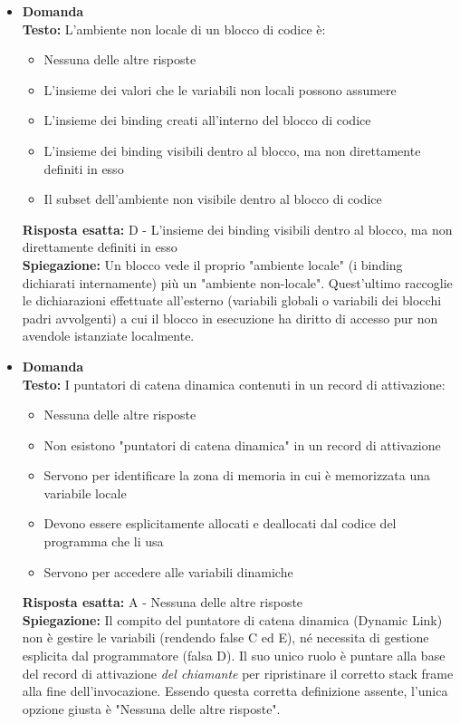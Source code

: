 \documentclass[12pt, a4paper]{article}
\newcounter{domandateoria}
\begin{document}
\begin{itemize}
    \item {}\textbf{Domanda \thedomandateoria} \\
    \textbf{Testo:} L'ambiente non locale di un blocco di codice è:
    \begin{itemize}
        \item[A)] Nessuna delle altre risposte
        \item[B)] L'insieme dei valori che le variabili non locali possono assumere
        \item[C)] L'insieme dei binding creati all'interno del blocco di codice
        \item[D)] L'insieme dei binding visibili dentro al blocco, ma non direttamente definiti in esso
        \item[E)] Il subset dell'ambiente non visibile dentro al blocco di codice
    \end{itemize}
    \textbf{Risposta esatta:} D - L'insieme dei binding visibili dentro al blocco, ma non direttamente definiti in esso \\
    \textbf{Spiegazione:} Un blocco vede il proprio "ambiente locale" (i binding dichiarati internamente) più un "ambiente non-locale". Quest'ultimo raccoglie le dichiarazioni effettuate all'esterno (variabili globali o variabili dei blocchi padri avvolgenti) a cui il blocco in esecuzione ha diritto di accesso pur non avendole istanziate localmente.
    \vspace{0.3cm}

    \item {}\textbf{Domanda \thedomandateoria} \\
    \textbf{Testo:} I puntatori di catena dinamica contenuti in un record di attivazione:
    \begin{itemize}
        \item[A)] Nessuna delle altre risposte
        \item[B)] Non esistono "puntatori di catena dinamica" in un record di attivazione
        \item[C)] Servono per identificare la zona di memoria in cui è memorizzata una variabile locale
        \item[D)] Devono essere esplicitamente allocati e deallocati dal codice del programma che li usa
        \item[E)] Servono per accedere alle variabili dinamiche
    \end{itemize}
    \textbf{Risposta esatta:} A - Nessuna delle altre risposte \\
    \textbf{Spiegazione:} Il compito del puntatore di catena dinamica (Dynamic Link) non è gestire le variabili (rendendo false C ed E), né necessita di gestione esplicita dal programmatore (falsa D). Il suo unico ruolo è puntare alla base del record di attivazione \textit{del chiamante} per ripristinare il corretto stack frame alla fine dell'invocazione. Essendo questa corretta definizione assente, l'unica opzione giusta è "Nessuna delle altre risposte".
    \vspace{0.3cm}
\end{itemize}
\end{document}
